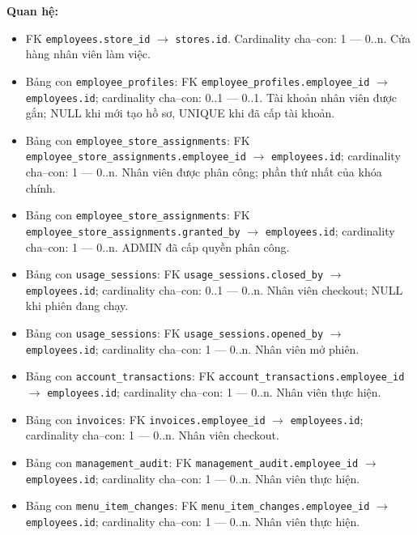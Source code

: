 \textbf{Quan hệ:}

\begin{itemize}

\item FK \texttt{employees.store\_id} $\rightarrow$ \texttt{stores.id}. Cardinality cha--con: 1 — 0..n. Cửa hàng nhân viên làm việc.

\item Bảng con \texttt{employee\_profiles}: FK \texttt{employee\_profiles.employee\_id} $\rightarrow$ \texttt{employees.id}; cardinality cha--con: 0..1 — 0..1. Tài khoản nhân viên được gắn; NULL khi mới tạo hồ sơ, UNIQUE khi đã cấp tài khoản.

\item Bảng con \texttt{employee\_store\_assignments}: FK \texttt{employee\_store\_assignments.employee\_id} $\rightarrow$ \texttt{employees.id}; cardinality cha--con: 1 — 0..n. Nhân viên được phân công; phần thứ nhất của khóa chính.

\item Bảng con \texttt{employee\_store\_assignments}: FK \texttt{employee\_store\_assignments.granted\_by} $\rightarrow$ \texttt{employees.id}; cardinality cha--con: 1 — 0..n. ADMIN đã cấp quyền phân công.

\item Bảng con \texttt{usage\_sessions}: FK \texttt{usage\_sessions.closed\_by} $\rightarrow$ \texttt{employees.id}; cardinality cha--con: 0..1 — 0..n. Nhân viên checkout; NULL khi phiên đang chạy.

\item Bảng con \texttt{usage\_sessions}: FK \texttt{usage\_sessions.opened\_by} $\rightarrow$ \texttt{employees.id}; cardinality cha--con: 1 — 0..n. Nhân viên mở phiên.

\item Bảng con \texttt{account\_transactions}: FK \texttt{account\_transactions.employee\_id} $\rightarrow$ \texttt{employees.id}; cardinality cha--con: 1 — 0..n. Nhân viên thực hiện.

\item Bảng con \texttt{invoices}: FK \texttt{invoices.employee\_id} $\rightarrow$ \texttt{employees.id}; cardinality cha--con: 1 — 0..n. Nhân viên checkout.

\item Bảng con \texttt{management\_audit}: FK \texttt{management\_audit.employee\_id} $\rightarrow$ \texttt{employees.id}; cardinality cha--con: 1 — 0..n. Nhân viên thực hiện.

\item Bảng con \texttt{menu\_item\_changes}: FK \texttt{menu\_item\_changes.employee\_id} $\rightarrow$ \texttt{employees.id}; cardinality cha--con: 1 — 0..n. Nhân viên thực hiện.


\end{itemize}
